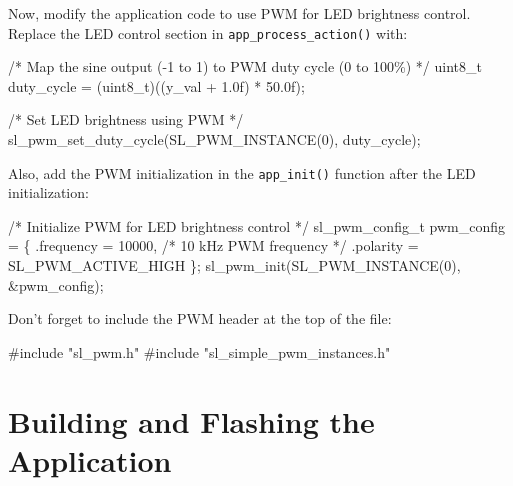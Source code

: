 \documentclass[
  9pt,
  letterpaper,
  abstract,
  titlepage]{scrbook}
\newenvironment{Shaded}{\begin{snugshade}}{\end{snugshade}}
\newcommand{\BuiltInTok}[1]{\textcolor[rgb]{0.00,0.23,0.31}{#1}}
\newcommand{\CommentTok}[1]{\textcolor[rgb]{0.37,0.37,0.37}{#1}}
\newcommand{\DataTypeTok}[1]{\textcolor[rgb]{0.68,0.00,0.00}{#1}}
\newcommand{\DecValTok}[1]{\textcolor[rgb]{0.68,0.00,0.00}{#1}}
\newcommand{\FloatTok}[1]{\textcolor[rgb]{0.68,0.00,0.00}{#1}}
\newcommand{\ImportTok}[1]{\textcolor[rgb]{0.00,0.46,0.62}{#1}}
\newcommand{\NormalTok}[1]{\textcolor[rgb]{0.00,0.23,0.31}{#1}}
\newcommand{\OperatorTok}[1]{\textcolor[rgb]{0.37,0.37,0.37}{#1}}
\newcommand{\PreprocessorTok}[1]{\textcolor[rgb]{0.68,0.00,0.00}{#1}}
\begin{document}
Now, modify the application code to use PWM for LED brightness control.
Replace the LED control section in \texttt{app\_process\_action()} with:

\begin{Shaded}
\begin{Highlighting}[]
\CommentTok{/* Map the sine output ({-}1 to 1) to PWM duty cycle (0 to 100\%) */}
\DataTypeTok{uint8\_t}\NormalTok{ duty\_cycle }\OperatorTok{=} \OperatorTok{(}\DataTypeTok{uint8\_t}\OperatorTok{)((}\NormalTok{y\_val }\OperatorTok{+} \FloatTok{1.0}\BuiltInTok{f}\OperatorTok{)} \OperatorTok{*} \FloatTok{50.0}\BuiltInTok{f}\OperatorTok{);}
  
\CommentTok{/* Set LED brightness using PWM */}
\NormalTok{sl\_pwm\_set\_duty\_cycle}\OperatorTok{(}\NormalTok{SL\_PWM\_INSTANCE}\OperatorTok{(}\DecValTok{0}\OperatorTok{),}\NormalTok{ duty\_cycle}\OperatorTok{);}
\end{Highlighting}
\end{Shaded}

Also, add the PWM initialization in the \texttt{app\_init()} function
after the LED initialization:

\begin{Shaded}
\begin{Highlighting}[]
\CommentTok{/* Initialize PWM for LED brightness control */}
\NormalTok{sl\_pwm\_config\_t pwm\_config }\OperatorTok{=} \OperatorTok{\{}
  \OperatorTok{.}\NormalTok{frequency }\OperatorTok{=} \DecValTok{10000}\OperatorTok{,}  \CommentTok{/* 10 kHz PWM frequency */}
  \OperatorTok{.}\NormalTok{polarity }\OperatorTok{=}\NormalTok{ SL\_PWM\_ACTIVE\_HIGH}
\OperatorTok{\};}
\NormalTok{sl\_pwm\_init}\OperatorTok{(}\NormalTok{SL\_PWM\_INSTANCE}\OperatorTok{(}\DecValTok{0}\OperatorTok{),} \OperatorTok{\&}\NormalTok{pwm\_config}\OperatorTok{);}
\end{Highlighting}
\end{Shaded}

Don't forget to include the PWM header at the top of the file:

\begin{Shaded}
\begin{Highlighting}[]
\PreprocessorTok{\#include }\ImportTok{"sl\_pwm.h"}
\PreprocessorTok{\#include }\ImportTok{"sl\_simple\_pwm\_instances.h"}
\end{Highlighting}
\end{Shaded}

\section{Building and Flashing the
Application}\label{building-and-flashing-the-application-1}
\end{document}
